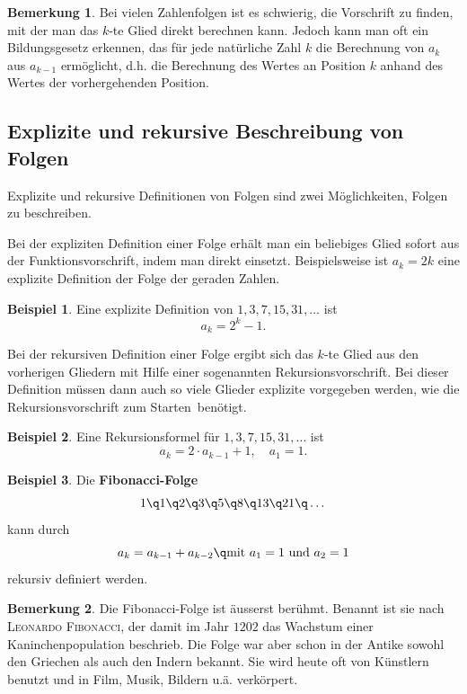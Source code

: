 \documentclass[%
11pt,%
twoside,%
titlepage,%
swissgerman,%
headsepline%
]{scrartcl}
\newcommand{\definition}[1]{\colorbox{emerald}{#1}}
\theoremstyle{definition}
\newtheorem{bsp}{Beispiel}[subsection] %
\newtheorem{bem}{Bemerkung}[subsection] %
\theoremstyle{plain}
\begin{document}
\begin{bem}
Bei vielen Zahlenfolgen ist es schwierig, die Vorschrift zu finden, mit der man das $k$-te Glied direkt berechnen kann. Jedoch kann man oft ein Bildungsgesetz erkennen, das f\"ur jede nat\"urliche Zahl $k$ die Berechnung von $a_k$ aus $a_{k-1}$ erm\"oglicht, d.h. die Berechnung des Wertes an Position $k$ anhand des Wertes der vorhergehenden Position.
\end{bem}

\subsection{Explizite und rekursive Beschreibung von Folgen}
Explizite und rekursive Definitionen von Folgen sind zwei M\"oglichkeiten, Folgen zu beschreiben.

Bei der \definition{expliziten Definition} einer Folge erh\"alt man ein beliebiges Glied sofort aus der Funktionsvorschrift, indem man direkt einsetzt. Beispielsweise ist $a_k=2k$ eine explizite Definition der Folge der geraden Zahlen.

\begin{bsp}
Eine explizite Definition von $1,3,7,15,31,\dots$
ist
$$a_k=2^k-1.$$
\end{bsp}

Bei der \definition{rekursiven Definition} einer Folge ergibt sich das $k$-te Glied aus den vorherigen Gliedern mit Hilfe einer sogenannten Rekursionsvorschrift. Bei dieser Definition m\"ussen dann auch so viele Glieder explizite vorgegeben werden, wie die Rekursionsvorschrift \glqq zum Starten\grqq\ ben\"otigt.

\begin{bsp}
Eine Rekursionsformel f\"ur $1,3,7,15,31,\dots$
ist
$$a_k=2\cdot a_{k-1}+1,\quad a_1=1.$$
\end{bsp}

\begin{bsp}
Die \textbf{Fibonacci-Folge}
$$1\q1\q2\q3\q5\q8\q13\q21\q\dots$$
kann durch
$$a_k=a_{k-1}+a_{k-2}\q\text{mit }a_1=1\text{ und }a_2=1$$
rekursiv definiert werden.
\end{bsp}

\begin{bem}
Die Fibonacci-Folge ist \"ausserst ber\"uhmt. Benannt ist sie nach \textsc{Leonardo Fibonacci}, der damit im Jahr $1202$ das Wachstum einer Kaninchenpopulation beschrieb. Die Folge war aber schon in der Antike sowohl den Griechen als auch den Indern bekannt. Sie wird heute oft von K\"unstlern benutzt und in Film, Musik, Bildern u.\"a. verk\"orpert.
\end{bem}
\end{document}
